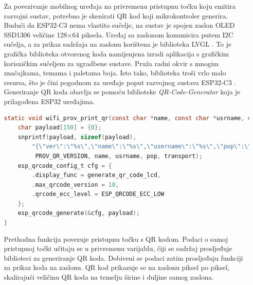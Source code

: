 Za povezivanje mobilnog uređaja na privremenu pristupnu točku koju emitira razvojni sustav, potrebno je skenirati QR kod koji mikrokontroler generira. Budući da ESP32-C3 nema vlastito sučelje, na sustav je spojen zaslon OLED SSD1306 veličine 128×64 piksela. Uređaj sa zaslonom komunicira putem I2C sučelja, a za prikaz sadržaja na zaslonu korištena je biblioteka LVGL . To je grafička biblioteka otvorenog koda namijenjena izradi aplikacija s grafičkim korisničkim sučeljem  za ugradbene sustave. Pruža radni okvir s mnogim značajkama, temama i paletama boja. Isto tako, biblioteka troši vrlo malo resursa, što je čini pogodnom za uređaje poput razvojnog sustava ESP32-C3 \cite{lvgl}. Generiranje QR koda obavlja se pomoću biblioteke \textit{QR-Code-Generator} koja je prilagođena ESP32 uređajima. 

\begin{lstlisting}[caption={Generiranje QR koda iz pristupne točke}, language=c]
static void wifi_prov_print_qr(const char *name, const char *usrname, const char *pop, const char *transport, lv_disp_t *disp) {
	char payload[150] = {0};
    snprintf(payload, sizeof(payload), 	
    	"{\"ver\":\"%s\",\"name\":\"%s\",\"username\":\"%s\",\"pop\":\"%s\",\"transport\":\"%s\"}",
    	 PROV_QR_VERSION, name, usrname, pop, transport);
    esp_qrcode_config_t cfg = {
		.display_func = generate_qr_code_lcd, 
		.max_qrcode_version = 10, 
		.qrcode_ecc_level = ESP_QRCODE_ECC_LOW
	};
	esp_qrcode_generate(&cfg, payload);
}
\end{lstlisting}

Prethodna funkcija povezuje pristupnu točku s QR kodom. Podaci o samoj pristupnoj točki učitaju se u privremenu varijablu, čiji se sadržaj prosljeđuje biblioteci za generiranje QR koda. Dobiveni se podaci zatim prosljeđuju funkciji za prikaz koda na zaslonu. QR kod prikazuje se na zaslonu piksel po piksel, skalirajući veličinu QR koda na temelju širine i duljine samog zaslona. 

